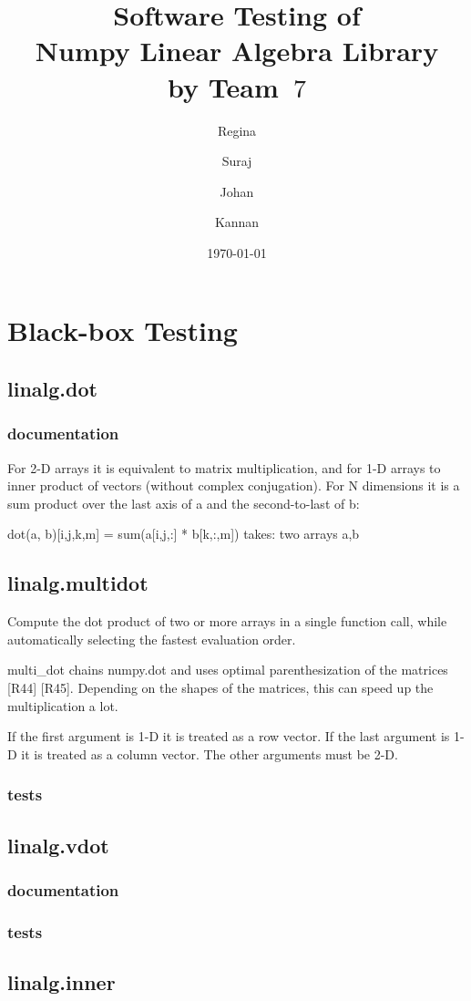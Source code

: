\documentclass[a4paper,11pt]{article}
\title{\textbf{Software Testing of \\ Numpy Linear Algebra Library\\
        by Team~$7$                                   %
}
}
\author{Regina \and Suraj \and Johan \and Kannan}  %
\date{\today}
\begin{document}
\section{Black-box Testing}
\subsection{linalg.dot}
\subsubsection{documentation}
For 2-D arrays it is equivalent to matrix multiplication, and for 1-D arrays to inner product of vectors (without complex conjugation). For N dimensions it is a sum product over the last axis of a and the second-to-last of b:

    dot(a, b)[i,j,k,m] = sum(a[i,j,:] * b[k,:,m])
    takes: two arrays a,b
    
\subsection{linalg.multidot}
Compute the dot product of two or more arrays in a single function call, while automatically selecting the fastest evaluation order.

multi\_dot chains numpy.dot and uses optimal parenthesization of the matrices [R44] [R45]. Depending on the shapes of the matrices, this can speed up the multiplication a lot.

If the first argument is 1-D it is treated as a row vector. If the last argument is 1-D it is treated as a column vector. The other arguments must be 2-D.
\subsubsection{tests}

\subsection{linalg.vdot}

\subsubsection{documentation}
\subsubsection{tests}

\subsection{linalg.inner}
\end{document}
